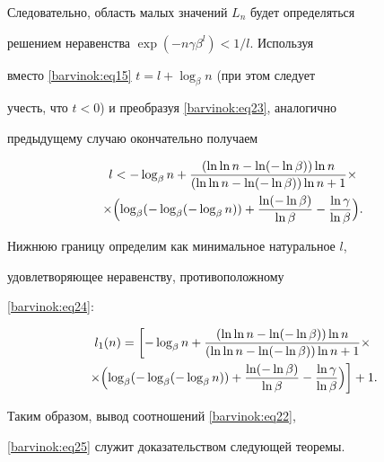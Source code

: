 Следовательно, область малых значений $L_n $ будет определяться

решением неравенства $\exp (-n\gamma \beta ^l)<1/l$. Используя

вместо \eqref{barvinok:eq15} $t=l+\log _\beta n$ (при этом следует

учесть, что $t<0$) 	и преобразуя \eqref{barvinok:eq23}, аналогично

предыдущему случаю окончательно получаем

\begin{multline}

\label{barvinok:eq24}

 l<-\log _\beta n+\frac{(\ln \ln n-\ln

(-\ln \beta ))\ln n}{(\ln \ln n-\ln (-\ln \beta ))\ln n+1} \times

\\

\times \Bigl( \log _\beta (-\log _\beta (-\log _\beta

n))+\frac{\ln (-\ln \beta )}{\ln \beta }-\frac{\ln \gamma }{\ln

\beta }\Bigr).

\end{multline}

Нижнюю границу определим как минимальное натуральное $l$,

удовлетворяющее неравенству, противоположному

\eqref{barvinok:eq24}:

\begin{multline}

\label{barvinok:eq25} l_1 (n)=\left[ -\log _\beta n+\frac{(\ln \ln

n-\ln (-\ln \beta ))\ln n}{(\ln \ln n-\ln (-\ln \beta ))\ln n+1}

\times \right.\\

\left. \times

\Bigl(\log _\beta (-\log _\beta (-\log _\beta

n))+\frac{\ln (-\ln \beta )}{\ln \beta }-\frac{\ln \gamma }{\ln

\beta }

\Bigr) \right]+1.

\end{multline}

Таким образом, вывод соотношений \eqref{barvinok:eq22},

\eqref{barvinok:eq25} служит доказательством следующей теоремы.



